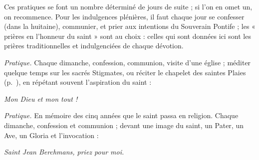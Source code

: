 \documentclass{bibliotheca-missel}
\begin{document}
\begin{notice}
Ces pratiques se font un nombre déterminé de jours de suite ; si l’on en omet un, on recommence. Pour les indulgences plénières, il faut chaque jour se confesser (dans la huitaine), communier, et prier aux intentions du Souverain Pontife ; les « prières en l’honneur du saint » sont au choix : celles qui sont données ici sont les prières traditionnelles et indulgenciées de chaque dévotion.
\end{notice}


\begin{notice}\textit{Pratique.} Chaque dimanche, confession, communion, visite d’une église ; méditer quelque temps sur les sacrés Stigmates, ou réciter le chapelet des saintes Plaies (p.~\pageref{plaies}), en répétant souvent l’aspiration du saint :\end{notice}
\priere\textit{Mon Dieu et mon tout !} 

\begin{notice}\textit{Pratique.} En mémoire des cinq années que le saint passa en religion. Chaque dimanche, confession et communion ; devant une image du saint, un Pater, un Ave, un Gloria et l’invocation :\end{notice}
\priere\textit{Saint Jean Berchmans, priez pour moi.}
\end{document}
